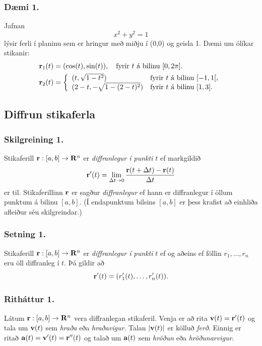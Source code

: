 \subsubsection{Dæmi 1.}
Jafnan
$$x^2+y^2 = 1$$
lýsir ferli í planinu sem er hringur með miðju í (0,0) og geisla 1. Dæmi um ólíkar stikanir:
\begin{align*}
\mbox{${\bf r}$}_1(t) &= (\cos(t),\sin(t)), \quad \text{fyrir $t$ á bilinu $[0,2\pi].$} \\
\mbox{${\bf r}$}_2(t) &= \left\{\begin{array}{ll}
(t,\sqrt{1-t^2}) & \text{fyrir $t$ á bilinu $[-1,1[,$} \\
(2-t,-\sqrt{1-(2-t)^2}) & \text{fyrir $t$ á bilinu $[1,3].$} 
\end{array}\right.
\end{align*}






\subsection{Diffrun stikaferla}
 \subsubsection{Skilgreining 1.}
Stikaferill $\mbox{${\bf r}$}:  [a,b]\rightarrow \mbox{${\bf R}^n$}$ er
{\em diffranlegur í punkti} $t$ ef markgildið 
$$\mbox{${\bf r}$}'(t)=\lim_{\Delta t\rightarrow 0}\frac{\mbox{${\bf r}$}(t+\Delta t)-\mbox{${\bf r}$}(t)}{\Delta t}$$
er til.  Stikaferillinn $\mbox{${\bf r}$}$ er sagður {\em diffranlegur} ef hann er
diffranlegur í öllum punktum á bilinu $[a,b]$.  (Í endapunktum bilsins
$[a,b]$ er þess krafist að einhliða afleiður séu skilgreindar.)


\subsubsection{\nopagebreak Setning 1.}  
   Stikaferill $\mbox{${\bf r}$}:  [a,b]\rightarrow \mbox{${\bf R}^n$}$ er
{\em diffranlegur í punkti} $t$ ef og aðeins ef föllin $r_1,\ldots,r_n$ eru
öll diffranleg í $t$.  Þá gildir að  
$$\mbox{${\bf r}$}'(t)=(r'_1(t),\ldots,r'_n(t)).$$ 
 
 \pause
\subsubsection{\nopagebreak Ritháttur 1.}   Látum $\mbox{${\bf r}$}:  [a,b]\rightarrow \mbox{${\bf R}^n$}$ vera diffranlegan stikaferil.  Venja er að rita $\mbox{${\bf v}$}(t)=\mbox{${\bf r}$}'(t)$ og tala um
$\mbox{${\bf v}$}(t)$ sem {\em hraða} eða {\em hraðavigur}.   Talan $|\mbox{${\bf v}$}(t)|$ er
kölluð {\em ferð}.   Einnig er ritað $\mbox{${\bf a}$}(t)=\mbox{${\bf v}$}'(t)=\mbox{${\bf r}$}''(t)$ og talað
um $\mbox{${\bf a}$}(t)$ sem {\em hröðun} eða {\em hröðunarvigur}.  



